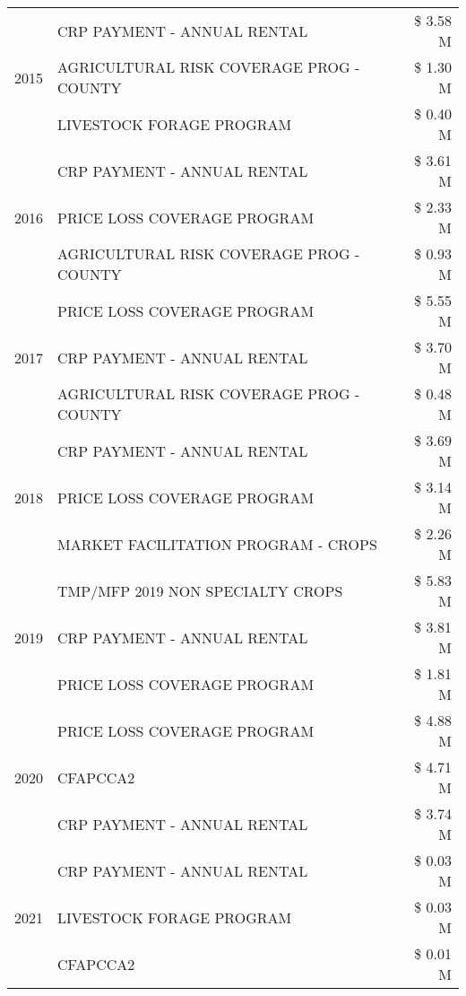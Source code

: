\begin{tabular}{llr}
\multirow[t]{3}{*}{2015} & CRP PAYMENT - ANNUAL RENTAL & \$ 3.58 M \\
 & AGRICULTURAL RISK COVERAGE PROG - COUNTY & \$ 1.30 M \\
 & LIVESTOCK FORAGE PROGRAM & \$ 0.40 M \\
\cline{1-3}
\multirow[t]{3}{*}{2016} & CRP PAYMENT - ANNUAL RENTAL & \$ 3.61 M \\
 & PRICE LOSS COVERAGE PROGRAM & \$ 2.33 M \\
 & AGRICULTURAL RISK COVERAGE PROG - COUNTY & \$ 0.93 M \\
\cline{1-3}
\multirow[t]{3}{*}{2017} & PRICE LOSS COVERAGE PROGRAM & \$ 5.55 M \\
 & CRP PAYMENT - ANNUAL RENTAL & \$ 3.70 M \\
 & AGRICULTURAL RISK COVERAGE PROG - COUNTY & \$ 0.48 M \\
\cline{1-3}
\multirow[t]{3}{*}{2018} & CRP PAYMENT - ANNUAL RENTAL & \$ 3.69 M \\
 & PRICE LOSS COVERAGE PROGRAM & \$ 3.14 M \\
 & MARKET FACILITATION PROGRAM - CROPS & \$ 2.26 M \\
\cline{1-3}
\multirow[t]{3}{*}{2019} & TMP/MFP 2019 NON SPECIALTY CROPS & \$ 5.83 M \\
 & CRP PAYMENT - ANNUAL RENTAL & \$ 3.81 M \\
 & PRICE LOSS COVERAGE PROGRAM & \$ 1.81 M \\
\cline{1-3}
\multirow[t]{3}{*}{2020} & PRICE LOSS COVERAGE PROGRAM & \$ 4.88 M \\
 & CFAPCCA2 & \$ 4.71 M \\
 & CRP PAYMENT - ANNUAL RENTAL & \$ 3.74 M \\
\cline{1-3}
\multirow[t]{3}{*}{2021} & CRP PAYMENT - ANNUAL RENTAL & \$ 0.03 M \\
 & LIVESTOCK FORAGE PROGRAM & \$ 0.03 M \\
 & CFAPCCA2 & \$ 0.01 M \\
\cline{1-3}
\bottomrule
\end{tabular}
